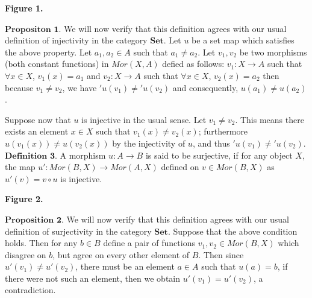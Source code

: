 \documentclass{article}
\theoremstyle{problemstyle}
\begin{document}
\begin{center}
\end{center}
\begin{center}
\textbf{Figure 1.}
\end{center}

$\textbf{Propositon 1.}$ We will now verify that this definition agrees with our usual definition of injectivity in the category $\textbf{Set}$. Let $u$ be a set map which satisfies the above property. Let $a_1,a_2 \in A$ such that $a_1 \neq a_2$. Let $v_1, v_2$ be two morphisms (both constant functions) in $Mor(X,A)$ defied as follows: $v_1:X \rightarrow A$ such that $\forall x \in X$, $v_1(x) = a_1$ and $v_2:X \rightarrow A$ such that $\forall x \in X$, $v_2(x) = a_2$ then because $v_1 \neq v_2$, we have $'u(v_1) \neq 'u(v_2)$ and consequently, $u(a_1) \neq u(a_2)$. 

Suppose now that $u$ is injective in the usual sense. Let $v_1 \neq v_2$. This means there exists an element $x \in X$ such that $v_1(x) \neq v_2(x)$; furthermore $u(v_1(x)) \neq u(v_2(x))$ by the injectivity of $u$, and thus $'u(v_1) \neq 'u(v_2)$. \\

$\textbf{Definition 3.}$ A morphism $u: A \rightarrow B$ is said to be surjective, if for any object $X$, the map $u': Mor(B,X) \rightarrow Mor(A,X)$ defined on $v \in Mor(B,X)$ as $u'(v) = v\circ u$ is injective.\\ 

\begin{center}
\end{center}
\begin{center}
\textbf{Figure 2.}
\end{center}


$\textbf{Proposition 2.}$ We will now verify that this definition agrees with our usual definition of surjectivity in the category $\textbf{Set}$.  Suppose that the above condition holds. Then for any $b \in B$ define a pair of functions $v_1,v_2 \in Mor(B,X)$ which disagree on $b$, but agree on every other element of $B$. Then since $u'(v_1) \neq u'(v_2)$, there must be an element $a \in A$ such that $u(a) = b$, if there were not such an element, then we obtain $u'(v_1) = u'(v_2)$, a contradiction. 
\end{document}
